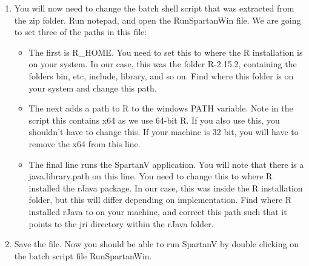 \documentclass[a4paper,11pt]{article}
\begin{document}
\begin{itemize}
\begin{enumerate}
\item You will now need to change the batch shell script that was extracted from the zip folder. Run notepad, and open the RunSpartanWin file. We are going to set three of the paths in this file:

\begin{itemize}
\item The first is R\_HOME. You need to set this to where the R installation is on your system. In our case, this was the folder R-2.15.2, containing the folders bin, etc, include, library, and so on. Find where this folder is on your system and change this path.
\item The next adds a path to R to the windows PATH variable. Note in the script this contains x64 as we use 64-bit R. If you also use this, you shouldn't have to change this. If your machine is 32 bit, you will have to remove the x64 from this line.
\item The final line runs the SpartanV application. You will note that there is a java.library.path on this line. You need to change this to where R installed the rJava package. In our case, this was inside the R installation folder, but this will differ depending on implementation. Find where R installed rJava to on your machine, and correct this path such that it points to the jri directory within the rJava folder.
\end{itemize}

\item Save the file. Now you should be able to run SpartanV by double clicking on the batch script file RunSpartanWin.

\end{enumerate}


\end{itemize}
\end{document}
